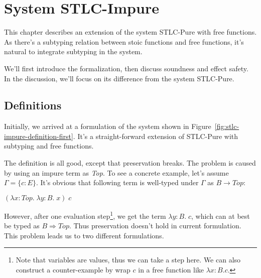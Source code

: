 \section{System STLC-Impure}

This chapter describes an extension of the system STLC-Pure with free
functions. As there's a subtyping relation between stoic functions and
free functions, it's natural to integrate subtyping in the system.

We'll first introduce the formalization, then discuss soundness and
effect safety. In the discussion, we'll focus on its difference from
the system STLC-Pure.

\subsection{Definitions}

Initially, we arrived at a formulation of the system shown in
Figure~\ref{fig:stlc-impure-definition-first}. It's a straight-forward
extension of STLC-Pure with subtyping and free functions.

The definition is all good, except that preservation breaks. The
problem is caused by using an impure term as \emph{Top}. To see a
concrete example, let's assume $\Gamma = \{c:E\}$. It's obvious that
following term is well-typed under $\Gamma$ as $B \to Top$:

\begin{center}
  $(\lambda x:Top. \; \lambda y:B. \; x) \; c$
\end{center}

However, after one evaluation step\footnote{Note that variables are
  values, thus we can take a step here. We can also construct a
  counter-example by wrap $c$ in a free function like
  $\lambda x:B. c$.}, we get the term $\lambda y:B. \; c$, which can
at best be typed as $B \Rightarrow Top$. Thus preservation doesn't
hold in current formulation. This problem leads us to two different
formulations.

